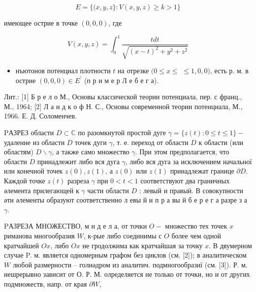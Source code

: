 \documentclass[10pt]{article}
\begin{document}
\[

E=\{(x, y, z\}: V(x, y, z) \geqslant k>1\}

\]



имеющее острие в точке $(0,0,0)$, где



\[

V(x, y, z)=\int_{0}^{1} \frac{t d t}{\sqrt{(x-t)^{2}+y^{2}+z^{2}}}

\]



\begin{itemize}

  \item нъютонов потенциал плотности $t$ на отрезке $(0 \leqslant x \leqslant$ $\leqslant 1,0,0)$, есть р. м. в острие $(0,0,0) \in E^{\prime}$ (п р и м е р Л е б е г а).

\end{itemize}



Лит.: [1] Б р е л о М., Основы классической теории потенциала, пер. с франц., М., 1964; [2] Л а н д к о ф Н. С., Основы современной теории потенциала, М., 1966. Е. Д. Соломенчев.



PАЗРЕЗ области $D \subset \mathbb{C}$ по разомкнутой простой дуге $\gamma=\{z(t): 0 \leqslant t \leqslant 1\}-$ удаление из области $D$ точек дуги $\gamma$, т. е. переход от области $D$ к области (или областям) $D \backslash \gamma$, а также само множество $\gamma$. При этом предполагается, что области $D$ принадлежит либо вся дуга $\gamma$, либо вся дуга за исключением начальної или конечной точек $z(0), z(1)$, а $z(0)$ или $z(1)$ принадлежат границе $\partial D$. Каждой точке $z(t)$ разреза $\gamma$ при $0<t<1$ соответствуют два граничных әлемента прилегающей к $\gamma$ части области $D$ : левый и правыӥ. В совокупности әти әлементы образуют соответственно л евы й и п р а вы й б е р е г а разре з а $\gamma$.



PАЗРЕЗА МНОЖЕСТВО, м н д е л а, от точки $O-$ множество тех точек $x$ риманова многообразия $W$, к-рые либо соединимы с $O$ более чем одной кратчайшей $O x$, либо $O x$ не гродолжима как кратчайшая за точку $x$. В двумерном случае P. м. является одномерным графом без циклов (см. [2]); в аналитическом $W$ любой размерности -- голиәдром из аналитич. подмногообразиї (см. [3]). Р. м. нешрерывно зависит от $О$. Р. М. олределяется не только от точки, но и от других подмножеств, напр. от края $\partial W$,
\end{document}
